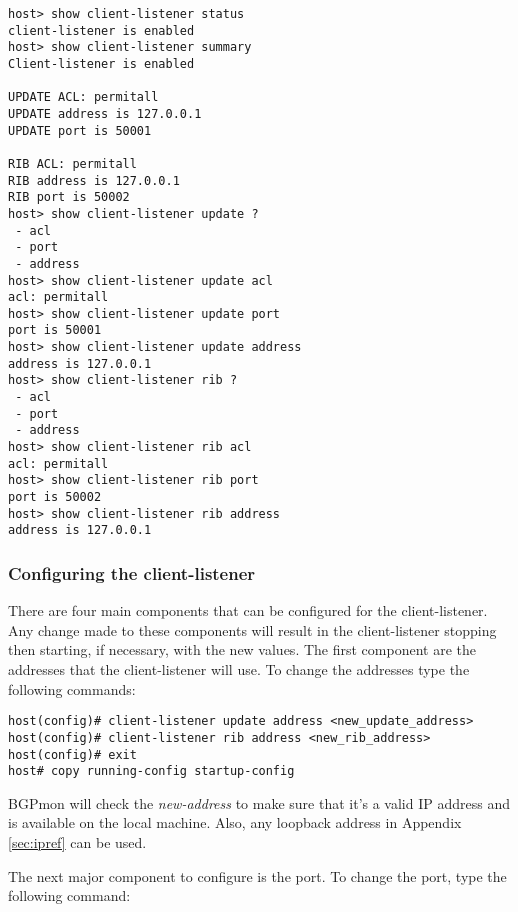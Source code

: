\begin{Verbatim}[frame=single]
host> show client-listener status
client-listener is enabled
host> show client-listener summary
Client-listener is enabled

UPDATE ACL: permitall
UPDATE address is 127.0.0.1
UPDATE port is 50001

RIB ACL: permitall
RIB address is 127.0.0.1
RIB port is 50002
host> show client-listener update ?
 - acl 
 - port 
 - address 
host> show client-listener update acl
acl: permitall
host> show client-listener update port
port is 50001
host> show client-listener update address
address is 127.0.0.1
host> show client-listener rib ?
 - acl 
 - port 
 - address 
host> show client-listener rib acl
acl: permitall
host> show client-listener rib port
port is 50002
host> show client-listener rib address
address is 127.0.0.1
\end{Verbatim}


\subsubsection{Configuring the client-listener}
\label{sec:configure:client:client-listener}

There are four main components that can be configured for the client-listener. 
Any change made to these components will result in the client-listener stopping then starting, if necessary, with the new values.
The first component are the addresses that the client-listener will use.
To change the addresses type the following commands:\\

\begin{Verbatim}[frame=single]
host(config)# client-listener update address <new_update_address>
host(config)# client-listener rib address <new_rib_address>
host(config)# exit
host# copy running-config startup-config
\end{Verbatim}

BGPmon will check the \emph{new-address} to make sure that it's a valid IP address and is available on the local machine.
Also, any loopback address in Appendix \ref{sec:ipref} can be used.

The next major component to configure is the port.  To change the port, type the following command:\\

